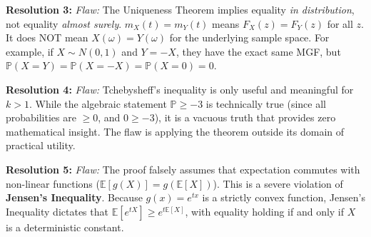 \documentclass[11pt, a4paper]{article}
\theoremstyle{definition}
\theoremstyle{remark}
\newcommand{\E}{\mathbb{E}}
\newcommand{\Prob}{\mathbb{P}}
\begin{document}
\textbf{Resolution 3:}
\textit{Flaw:} The Uniqueness Theorem implies equality \textit{in distribution}, not equality \textit{almost surely}. $m_X(t) = m_Y(t)$ means $F_X(z) = F_Y(z)$ for all $z$. It does NOT mean $X(\omega) = Y(\omega)$ for the underlying sample space. For example, if $X \sim N(0,1)$ and $Y = -X$, they have the exact same MGF, but $\Prob(X = Y) = \Prob(X = -X) = \Prob(X = 0) = 0$.

\textbf{Resolution 4:}
\textit{Flaw:} Tchebysheff's inequality is only useful and meaningful for $k > 1$. While the algebraic statement $\Prob \ge -3$ is technically true (since all probabilities are $\ge 0$, and $0 \ge -3$), it is a vacuous truth that provides zero mathematical insight. The flaw is applying the theorem outside its domain of practical utility.

\textbf{Resolution 5:}
\textit{Flaw:} The proof falsely assumes that expectation commutes with non-linear functions ($\E[g(X)] = g(\E[X])$). This is a severe violation of \textbf{Jensen's Inequality}. Because $g(x) = e^{tx}$ is a strictly convex function, Jensen's Inequality dictates that $\E[e^{tX}] \ge e^{t\E[X]}$, with equality holding if and only if $X$ is a deterministic constant.
\end{document}
